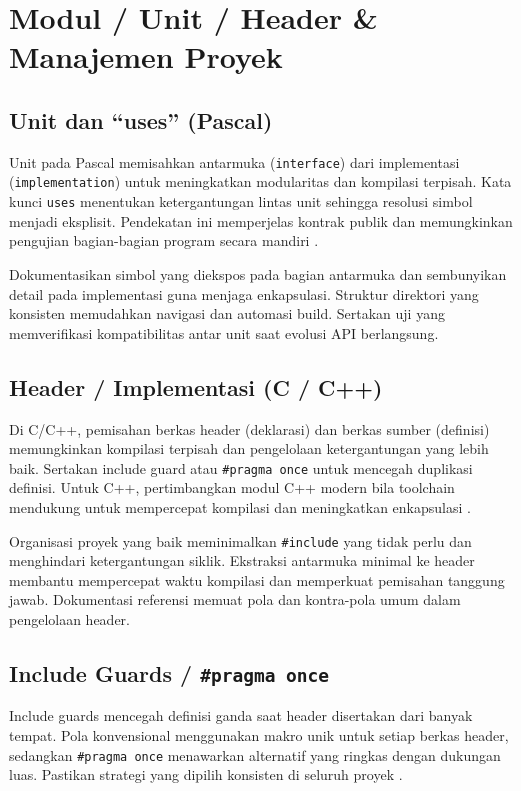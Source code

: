 \documentclass[../main.tex]{subfiles}
\begin{document}
\chapter{Modul / Unit / Header \& Manajemen Proyek}
\section{Unit dan ``uses'' (Pascal)}
Unit pada Pascal memisahkan antarmuka (\texttt{interface}) dari implementasi (\texttt{implementation}) untuk meningkatkan modularitas dan kompilasi terpisah. Kata kunci \texttt{uses} menentukan ketergantungan lintas unit sehingga resolusi simbol menjadi eksplisit. Pendekatan ini memperjelas kontrak publik dan memungkinkan pengujian bagian-bagian program secara mandiri \parencite{free-pascal-docs,pascal-tutorial-wikibooks}.

Dokumentasikan simbol yang diekspos pada bagian antarmuka dan sembunyikan detail pada implementasi guna menjaga enkapsulasi. Struktur direktori yang konsisten memudahkan navigasi dan automasi build. Sertakan uji yang memverifikasi kompatibilitas antar unit saat evolusi API berlangsung.

\section{Header / Implementasi (C / C++)}
Di C/C++, pemisahan berkas header (deklarasi) dan berkas sumber (definisi) memungkinkan kompilasi terpisah dan pengelolaan ketergantungan yang lebih baik. Sertakan include guard atau \texttt{\#pragma once} untuk mencegah duplikasi definisi. Untuk C++, pertimbangkan modul C++ modern bila toolchain mendukung untuk mempercepat kompilasi dan meningkatkan enkapsulasi \parencite{gnu-c-manual,cpp-reference}.

Organisasi proyek yang baik meminimalkan \texttt{#include} yang tidak perlu dan menghindari ketergantungan siklik. Ekstraksi antarmuka minimal ke header membantu mempercepat waktu kompilasi dan memperkuat pemisahan tanggung jawab. Dokumentasi referensi memuat pola dan kontra-pola umum dalam pengelolaan header.

\section{Include Guards / \texttt{\#pragma once}}
Include guards mencegah definisi ganda saat header disertakan dari banyak tempat. Pola konvensional menggunakan makro unik untuk setiap berkas header, sedangkan \texttt{\#pragma once} menawarkan alternatif yang ringkas dengan dukungan luas. Pastikan strategi yang dipilih konsisten di seluruh proyek \parencite{gnu-c-manual,cpp-reference}.
\end{document}
